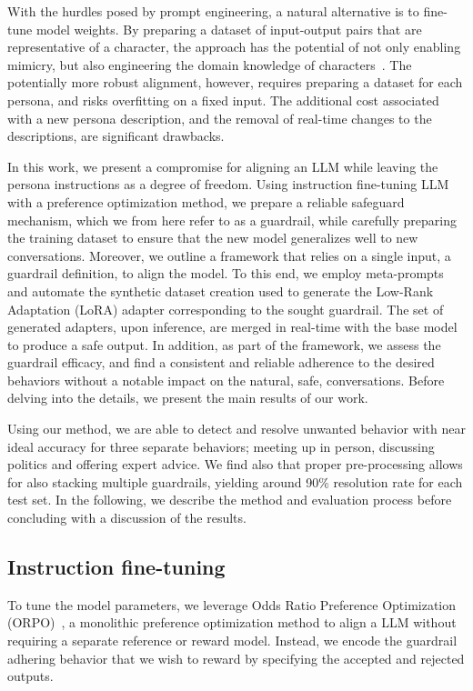 \documentclass[letterpaper]{article}
\begin{document}
With the hurdles posed by prompt engineering, a natural alternative is to fine-tune model weights. By preparing a dataset of input-output pairs that are representative of a character, the approach has the potential of not only enabling mimicry, but also engineering the domain knowledge of characters~\cite{zhang2023instruction, shao2023character}.
The potentially more robust alignment, however, requires preparing a dataset for each persona, and risks overfitting on a fixed input. The additional cost associated with a new persona description, and the removal of real-time changes to the descriptions, are significant drawbacks.

In this work, we present a compromise for aligning an LLM while leaving the persona instructions as a degree of freedom. Using instruction fine-tuning LLM with a preference optimization method, we prepare a reliable safeguard mechanism, which we from here refer to as a guardrail, while carefully preparing the training dataset to ensure that the new model generalizes well to new conversations. Moreover, we outline a framework that relies on a single input, a guardrail definition, to align the model. 
To this end, we employ meta-prompts and automate the synthetic dataset creation used to generate the Low-Rank Adaptation (LoRA) adapter corresponding to the sought guardrail. The set of generated adapters, upon inference, are merged in real-time with the base model to produce a safe output. 
In addition, as part of the framework, we assess the guardrail efficacy, and find a consistent and reliable adherence to the desired behaviors without a notable impact on the natural, safe, conversations.
Before delving into the details, we present the main results of our work. 

Using our method, we are able to detect and resolve unwanted behavior with near ideal accuracy for three separate behaviors; meeting up in person, discussing politics and offering expert advice. We find also that proper pre-processing allows for also stacking multiple guardrails, yielding around 90\% resolution rate for each test set. In the following, we describe the method and evaluation process before concluding with a discussion of the results.

\subsection{Instruction fine-tuning}
To tune the model parameters, we leverage Odds Ratio Preference Optimization (ORPO)~\cite{hong2024orpo}, a monolithic preference optimization method to align a LLM without requiring a separate reference or reward model. Instead, we encode the guardrail adhering behavior that we wish to reward by specifying the accepted and rejected outputs.
\end{document}
